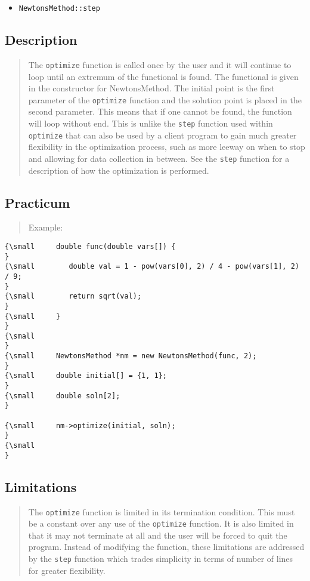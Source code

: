 \begin{itemize}
\item \texttt{NewtonsMethod::step}
\end{itemize}

\subsection*{Description}

\begin{quotation}
The \texttt{optimize} function is called once by the user and it will
continue to loop until an extremum of the functional is found. The
functional is given in the constructor for NewtonsMethod. The initial point
is the first parameter of the \texttt{optimize} function and the solution
point is placed in the second parameter. This means that if one cannot be
found, the function will loop without end. This is unlike the \texttt{step}
function used within \texttt{optimize} that can also be used by a client
program to gain much greater flexibility in the optimization process, such
as more leeway on when to stop and allowing for data collection in between.
See the \texttt{step} function for a description of how the optimization is
performed.
\end{quotation}

\subsection*{Practicum}

\begin{quotation}
Example:{\small }
\end{quotation}

\begin{verbatim}
{\small     double func(double vars[]) {
}
{\small        double val = 1 - pow(vars[0], 2) / 4 - pow(vars[1], 2) / 9;
}
{\small        return sqrt(val);
}
{\small     }
}
{\small     
}
{\small     NewtonsMethod *nm = new NewtonsMethod(func, 2);
}
{\small     double initial[] = {1, 1};
}
{\small     double soln[2];
}
 
{\small     nm->optimize(initial, soln);
}
{\small   
}
\end{verbatim}

\subsection*{Limitations}

\begin{quotation}
The \texttt{optimize} function is limited in its termination condition. This
must be a constant over any use of the \texttt{optimize} function. It is
also limited in that it may not terminate at all and the user will be forced
to quit the program. Instead of modifying the function, these limitations
are addressed by the \texttt{step} function which trades simplicity in terms
of number of lines for greater flexibility.
\end{quotation}


